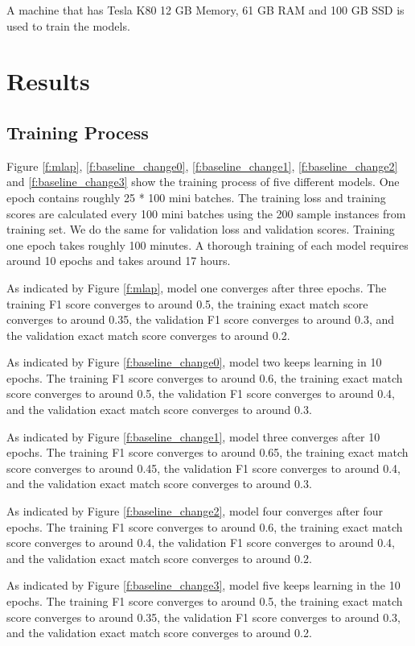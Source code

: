 \documentclass[modernstyle,12pt]{sjsuthesis}
\theoremstyle{definition}
\begin{document}
A machine that has Tesla K80 12 GB Memory, 61 GB RAM and 100 GB SSD is used to train the models.

\section{Results}
\subsection{Training Process}

Figure \ref{f:mlap}, \ref{f:baseline_change0}, \ref{f:baseline_change1}, \ref{f:baseline_change2} and \ref{f:baseline_change3} show the training process of five different models. One epoch contains roughly 25 * 100 mini batches. The training loss and training scores are calculated every 100 mini batches using the 200 sample instances from training set. We do the same for validation loss and validation scores. Training one epoch takes roughly 100 minutes. A thorough training of each model requires around 10 epochs and takes around 17 hours.

As indicated by Figure \ref{f:mlap}, model one converges after three epochs. The training F1 score converges to around 0.5, the training exact match score converges to around 0.35, the validation F1 score converges to around 0.3, and the validation exact match score converges to around 0.2.

As indicated by Figure \ref{f:baseline_change0}, model two keeps learning in 10 epochs. The training F1 score converges to around 0.6, the training exact match score converges to around 0.5, the validation F1 score converges to around 0.4, and the validation exact match score converges to around 0.3.

As indicated by Figure \ref{f:baseline_change1}, model three converges after 10 epochs. The training F1 score converges to around 0.65, the training exact match score converges to around 0.45, the validation F1 score converges to around 0.4, and the validation exact match score converges to around 0.3.

As indicated by Figure \ref{f:baseline_change2}, model four converges after four epochs. The training F1 score converges to around 0.6, the training exact match score converges to around 0.4, the validation F1 score converges to around 0.4, and the validation exact match score converges to around 0.2.

As indicated by Figure \ref{f:baseline_change3}, model five keeps learning in the 10 epochs. The training F1 score converges to around 0.5, the training exact match score converges to around 0.35, the validation F1 score converges to around 0.3, and the validation exact match score converges to around 0.2.
\end{document}

